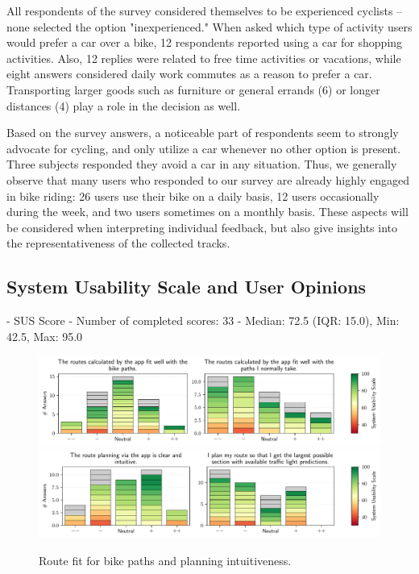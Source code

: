 All respondents of the survey considered themselves to be experienced cyclists -- none selected the option "inexperienced." When asked which type of activity users would prefer a car over a bike, 12 respondents reported using a car for shopping activities. Also, 12 replies were related to free time activities or vacations, while eight answers considered daily work commutes as a reason to prefer a car. Transporting larger goods such as furniture or general errands (6) or longer distances (4) play a role in the decision as well. 

Based on the survey answers, a noticeable part of respondents seem to strongly advocate for cycling, and only utilize a car whenever no other option is present. Three subjects responded they avoid a car in any situation. Thus, we generally observe that many users who responded to our survey are already highly engaged in bike riding: 26 users use their bike on a daily basis, 12 users occasionally during the week, and two users sometimes on a monthly basis. These aspects will be considered when interpreting individual feedback, but also give insights into the representativeness of the collected tracks.

\subsection{System Usability Scale and User Opinions}



- SUS Score
- Number of completed scores: 33
- Median: 72.5 (IQR: 15.0), Min: 42.5, Max: 95.0

\begin{figure}[t]
\caption{Route fit for bike paths and planning intuitiveness.}\label{fig:route-fit-bike-paths}
\includegraphics[width=\linewidth]{images/app-usability-questions-route-fit-bike-paths.pdf}
\\
\includegraphics[width=\linewidth]{images/app-usability-questions-route-planning-intuitiveness.pdf}
\end{figure}

